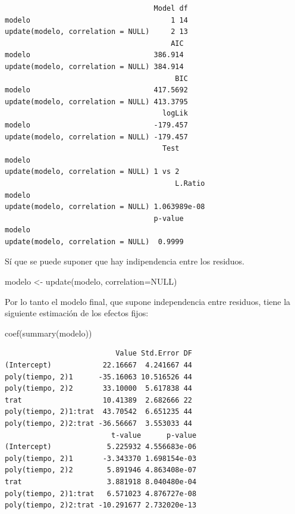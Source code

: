 \documentclass[
]{book}
\newenvironment{Shaded}{\begin{snugshade}}{\end{snugshade}}
\newcommand{\AttributeTok}[1]{\textcolor[rgb]{0.77,0.63,0.00}{#1}}
\newcommand{\ConstantTok}[1]{\textcolor[rgb]{0.00,0.00,0.00}{#1}}
\newcommand{\FunctionTok}[1]{\textcolor[rgb]{0.00,0.00,0.00}{#1}}
\newcommand{\NormalTok}[1]{#1}
\newcommand{\OtherTok}[1]{\textcolor[rgb]{0.56,0.35,0.01}{#1}}
\begin{document}
\begin{verbatim}
                                   Model df
modelo                                 1 14
update(modelo, correlation = NULL)     2 13
                                       AIC
modelo                             386.914
update(modelo, correlation = NULL) 384.914
                                        BIC
modelo                             417.5692
update(modelo, correlation = NULL) 413.3795
                                     logLik
modelo                             -179.457
update(modelo, correlation = NULL) -179.457
                                     Test
modelo                                   
update(modelo, correlation = NULL) 1 vs 2
                                        L.Ratio
modelo                                         
update(modelo, correlation = NULL) 1.063989e-08
                                   p-value
modelo                                    
update(modelo, correlation = NULL)  0.9999
\end{verbatim}

Sí que se puede suponer que hay indipendencia entre los residuos.

\begin{Shaded}
\begin{Highlighting}[]
\NormalTok{modelo }\OtherTok{\textless{}{-}} \FunctionTok{update}\NormalTok{(modelo, }\AttributeTok{correlation=}\ConstantTok{NULL}\NormalTok{)}
\end{Highlighting}
\end{Shaded}

Por lo tanto el modelo final, que supone independencia entre residuos, tiene la siguiente estimación de los efectos fijos:

\begin{Shaded}
\begin{Highlighting}[]
\FunctionTok{coef}\NormalTok{(}\FunctionTok{summary}\NormalTok{(modelo))}
\end{Highlighting}
\end{Shaded}

\begin{verbatim}
                          Value Std.Error DF
(Intercept)            22.16667  4.241667 44
poly(tiempo, 2)1      -35.16063 10.516526 44
poly(tiempo, 2)2       33.10000  5.617838 44
trat                   10.41389  2.682666 22
poly(tiempo, 2)1:trat  43.70542  6.651235 44
poly(tiempo, 2)2:trat -36.56667  3.553033 44
                         t-value      p-value
(Intercept)             5.225932 4.556683e-06
poly(tiempo, 2)1       -3.343370 1.698154e-03
poly(tiempo, 2)2        5.891946 4.863408e-07
trat                    3.881918 8.040480e-04
poly(tiempo, 2)1:trat   6.571023 4.876727e-08
poly(tiempo, 2)2:trat -10.291677 2.732020e-13
\end{verbatim}
\end{document}
